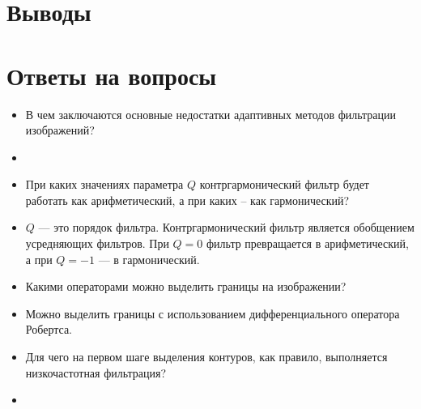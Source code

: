 \section{Выводы}

\section{Ответы на вопросы}

\setcounter{question}{0}

\newcommand{\question}[1]{\item[Q\refstepcounter{question}\thequestion.] #1}
\newcommand{\answer}[1]{\item[A\thequestion.] #1}

\begin{itemize}

\question{В чем заключаются основные недостатки адаптивных методов фильтрации изображений?}
\answer{}

\question{При каких значениях параметра $Q$ контргармонический фильтр будет работать как арифметический, а при каких -- как гармонический?}
\answer{$Q$ — это порядок фильтра. Контргармонический фильтр является обобщением усредняющих фильтров. При $Q = 0$ фильтр превращается в арифметический, а при $Q = -1$ — в гармонический.}

\question{Какими операторами можно выделить границы на изображении?}
\answer{Можно выделить границы с использованием дифференциального оператора
Робертса.}

\question{Для чего на первом шаге выделения контуров, как правило, выполняется низкочастотная фильтрация?}
\answer{}

\end{itemize}
